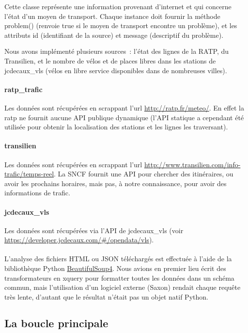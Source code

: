 \documentclass[a4paper, 8pt]{article}
\begin{document}
Cette classe représente une information provenant d'internet et qui concerne
l'état d'un moyen de transport.
Chaque instance doit fournir la méthode problem() (renvoie true si le moyen de
transport encontre un problème), et les attributs id (identifiant de la source)
et message (descriptif du problème).

Nous avons implémenté plusieurs sources~: l'état des lignes de la RATP, du
Transilien, et le nombre de vélos et de places libres dans les stations de
jcdecaux\_vls (vélos en libre service disponibles dans de nombreuses villes).

\paragraph{ratp\_trafic} Les données sont récupérées en scrappant l'url
\url{http://ratp.fr/meteo/}.
En effet la ratp ne fournit aucune API publique dynamique (l'API statique a
cependant été utilisée pour obtenir la localisation des stations et les lignes
les traversant).

\paragraph{transilien} Les données sont récupérées en scrappant l'url \url{http://www.transilien.com/info-trafic/temps-reel}.
La SNCF fournit une API pour chercher des itinéraires, ou avoir les prochains
horaires, mais pas, à notre connaissance, pour avoir des informations de trafic.

\paragraph{jcdecaux\_vls} Les données sont récupérées via l'API de jcdecaux\_vls
(voir \url{https://developer.jcdecaux.com/#/opendata/vls}).

\paragraph{} L'analyse des fichiers HTML ou JSON téléchargés est effectuée à
l'aide de la bibliothèque Python
\href{http://www.crummy.com/software/BeautifulSoup/bs4/doc/}{BeautifulSoup4}.
Nous avions en premier lieu écrit des transformateurs en xquery pour formatter
toutes les données dans un schéma commun, mais l'utilisation d'un logiciel
externe (Saxon) rendait chaque requête très lente, d'autant que le résultat
n'était pas un objet natif Python.

\subsection{La boucle principale}
\end{document}
